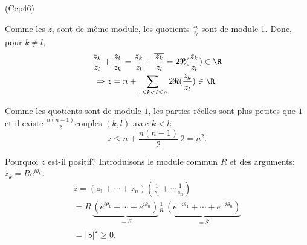 \begin{tiny}(Ccp46)\end{tiny} Comme les $z_i$ sont de même module, les quotients $\frac{z_k}{z_l}$ sont de module 1. Donc, pour $k \neq l$,
\begin{multline*}
  \frac{z_k}{z_l} + \frac{z_l}{z_k} = \frac{z_k}{z_l} + \overline{\frac{z_k}{z_l}} = 2 \Re( \frac{z_k}{z_l}) \in \R \\
  \Rightarrow z = n + \sum_{1\leq k < l \leq n}2 \Re( \frac{z_k}{z_l}) \in \R.
\end{multline*}

Comme les quotients sont de module $1$, les parties réelles sont plus petites que $1$ et il existe $\frac{n(n-1)}{2}$couples $(k,l)$ avec $k < l$:
\begin{displaymath}
  z \leq n + \frac{n(n-1)}{2}\, 2 = n^2.
\end{displaymath}

Pourquoi $z$ est-il positif? Introduisons le module commun $R$ et des arguments: $z_k = R e^{i\theta_k}$.
\begin{multline*}
  z = (z_1 + \cdots + z_n)(\frac{1}{z_1} + \cdots \frac{1}{z_n}) \\
  = R\,\underset{ = S}{\underbrace{(e^{i \theta_1} + \cdots + e^{i \theta_n})}}
  \frac{1}{R}\,\underset{ = \overline{S}}{\underbrace{(e^{-i \theta_1} + \cdots + e^{-i \theta_n})}} \\
  = |S|^2 \geq 0.
\end{multline*}
